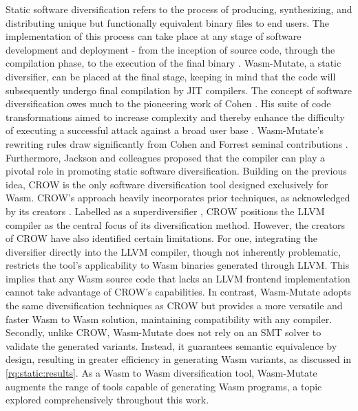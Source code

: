 \documentclass[sigplan,screen]{acmart}
\newcommand{\tool}{{\sc Wasm-Mutate}\xspace}
\newcommand{\wasm}{Wasm\xspace}
\begin{document}
Static software diversification refers to the process of producing, synthesizing, and distributing unique but functionally equivalent binary files to end users. 
The implementation of this process can take place at any stage of software development and deployment - from the inception of source code, through the compilation phase, to the execution of the final binary \cite{jackson2011compiler, lundquist2016searching}.
\tool, a static diversifier, can be placed at the final stage, keeping in mind that the code will subsequently undergo final compilation by JIT compilers.
The concept of software diversification owes much to the pioneering work of Cohen \cite{cohen1993operating}. 
His suite of code transformations aimed to increase complexity and thereby enhance the difficulty of executing a successful attack against a broad user base \cite{cohen1993operating}. 
\tool's rewriting rules draw significantly from Cohen and Forrest seminal contributions \cite{cohen1993operating, 595185}.
Furthermore, Jackson and colleagues \cite{jackson2011compiler} proposed that the compiler can play a pivotal role in promoting static software diversification. 
Building on the previous idea, CROW is the only software diversification tool designed exclusively for \wasm. 
CROW's approach heavily incorporates prior techniques, as acknowledged by its creators \cite{arteaga2020crow}. 
Labelled as a superdiversifier \cite{jacob2008superdiversifier}, CROW positions the LLVM compiler as the central focus of its diversification method. 
However, the creators of CROW have also identified certain limitations.
For one, integrating the diversifier directly into the LLVM compiler, though not inherently problematic, restricts the tool's applicability to \wasm binaries generated through LLVM. 
This implies that any \wasm source code that lacks an LLVM frontend implementation cannot take advantage of CROW's capabilities.
In contrast, \tool adopts the same diversification techniques as CROW but provides a more versatile and faster \wasm to \wasm solution, maintaining compatibility with any compiler. 
Secondly, unlike CROW, \tool does not rely on an SMT solver to validate the generated variants. 
Instead, it guarantees semantic equivalence by design, resulting in greater efficiency in generating \wasm variants, as discussed in \autoref{rq:static:results}.
As a \wasm to \wasm diversification tool, \tool augments the range of tools capable of generating \wasm programs, a topic explored comprehensively throughout this work.
\end{document}
